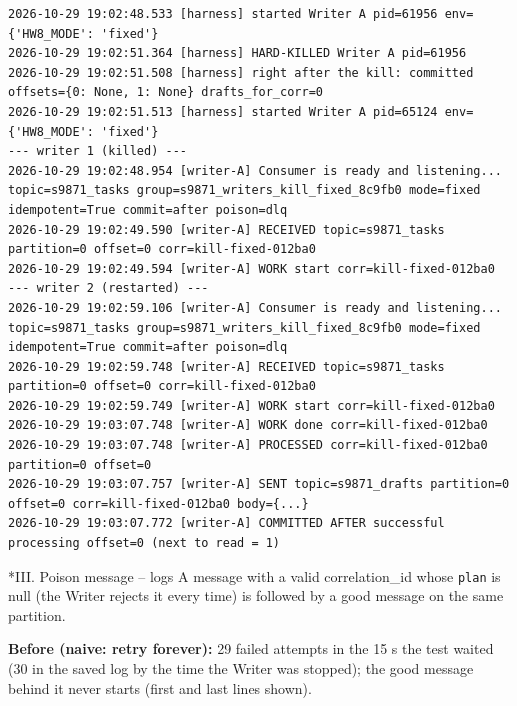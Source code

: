 \documentclass[11pt]{article}
\makeatletter
\renewcommand\subsection{\@startsection{subsection}{2}{\z@}{-2.2ex \@plus -1ex \@minus -.2ex}{0.8ex \@plus.2ex}{\normalfont\fontsize{12}{14.5}\selectfont\bfseries}}
\makeatother
\begin{document}
\begingroup\lstset{basicstyle=\ttfamily\tiny}
\begin{lstlisting}
2026-10-29 19:02:48.533 [harness] started Writer A pid=61956 env={'HW8_MODE': 'fixed'}
2026-10-29 19:02:51.364 [harness] HARD-KILLED Writer A pid=61956
2026-10-29 19:02:51.508 [harness] right after the kill: committed offsets={0: None, 1: None} drafts_for_corr=0
2026-10-29 19:02:51.513 [harness] started Writer A pid=65124 env={'HW8_MODE': 'fixed'}
--- writer 1 (killed) ---
2026-10-29 19:02:48.954 [writer-A] Consumer is ready and listening... topic=s9871_tasks group=s9871_writers_kill_fixed_8c9fb0 mode=fixed idempotent=True commit=after poison=dlq
2026-10-29 19:02:49.590 [writer-A] RECEIVED topic=s9871_tasks partition=0 offset=0 corr=kill-fixed-012ba0
2026-10-29 19:02:49.594 [writer-A] WORK start corr=kill-fixed-012ba0
--- writer 2 (restarted) ---
2026-10-29 19:02:59.106 [writer-A] Consumer is ready and listening... topic=s9871_tasks group=s9871_writers_kill_fixed_8c9fb0 mode=fixed idempotent=True commit=after poison=dlq
2026-10-29 19:02:59.748 [writer-A] RECEIVED topic=s9871_tasks partition=0 offset=0 corr=kill-fixed-012ba0
2026-10-29 19:02:59.749 [writer-A] WORK start corr=kill-fixed-012ba0
2026-10-29 19:03:07.748 [writer-A] WORK done corr=kill-fixed-012ba0
2026-10-29 19:03:07.748 [writer-A] PROCESSED corr=kill-fixed-012ba0 partition=0 offset=0
2026-10-29 19:03:07.757 [writer-A] SENT topic=s9871_drafts partition=0 offset=0 corr=kill-fixed-012ba0 body={...}
2026-10-29 19:03:07.772 [writer-A] COMMITTED AFTER successful processing offset=0 (next to read = 1)
\end{lstlisting}
\endgroup
\subsection*{III. Poison message -- logs}
A message with a valid correlation\_id whose \texttt{plan} is null (the Writer rejects it every time) is followed by a good message on the same partition.

\textbf{Before (naive: retry forever):} 29 failed attempts in the 15 s the test waited (30 in the saved log by the time the Writer was stopped); the good message behind it never starts (first and last lines shown).
\end{document}
